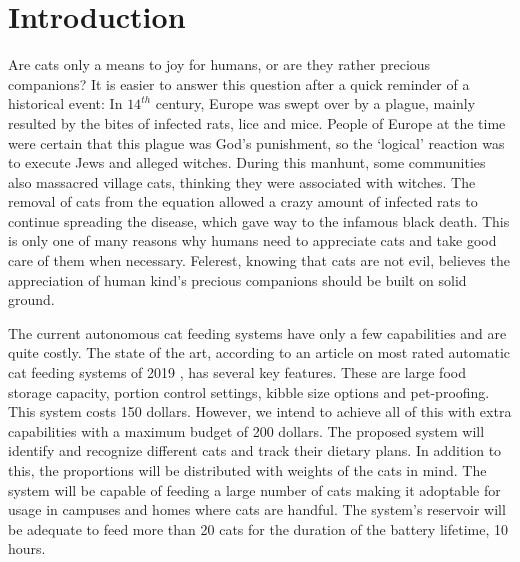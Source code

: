 
\section{Introduction} \label{sec:intro}

Are cats only a means to joy for humans, or are they rather precious companions? It is easier to answer this question after a quick reminder of a historical event: In \(14^{th}\) century, Europe was swept over by a plague, mainly resulted by the bites of infected rats, lice and mice. People of Europe at the time were certain that this plague was God's punishment, so the `logical' reaction was to execute Jews and alleged witches. During this manhunt, some communities also massacred village cats, thinking they were associated with witches. The removal of cats from the equation allowed a crazy amount of infected rats to continue spreading the disease, which gave way to the infamous black death.
This is only one of many reasons why humans need to appreciate cats and take good care of them when necessary. Felerest, knowing that cats are not evil, believes the appreciation of human kind's precious companions should be built on solid ground.





The current autonomous cat feeding systems have only a few capabilities and are quite costly. The state of the art, according to an article on most rated automatic cat feeding systems of 2019 \cite{cite:SOTA}, has several key features. These are large food storage capacity, portion control settings, kibble size options and pet-proofing. This system costs 150 dollars. However, we intend to achieve all of this with extra capabilities with a maximum budget of 200 dollars. The proposed system will identify and recognize different cats and track their dietary plans. In addition to this, the proportions will be distributed with weights of the cats in mind. The system will be capable of feeding a large number of cats making it adoptable for usage in campuses and homes where cats are handful. The system's reservoir will be adequate to feed more than 20 cats for the duration of the battery lifetime, 10 hours.

